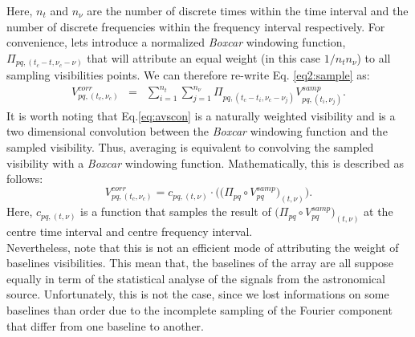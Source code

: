 \documentclass[useAMS,usenatbib]{mn2e}
\begin{document}
Here, $n_t$ and $n_{\nu}$ are the number of discrete times within the time interval  and the number of discrete frequencies 
within the frequency interval  respectively. For convenience, lets introduce a normalized \textit{Boxcar} windowing 
function, $\Pi_{pq,(t_c - t,\nu_c -\nu)}$  that will attribute an equal weight (in this case $1/n_t n_{\nu}$) to all sampling visibilities 
points. We can therefore re-write Eq. \ref{eq2:sample} as:
\begin{eqnarray}
V_{pq,(t_c,\nu_c)}^{corr}&=&\sum_{i=1}^{n_t}\sum_{j=1}^{n_{\nu}}\Pi_{pq,(t_c - t_i,\nu_c -\nu_j)}V_{pq,(t_i,\nu_j)}^{samp}. 
\label{eq:avscon}
\end{eqnarray}
It is worth noting that Eq.\ref{eq:avscon} is a naturally weighted visibility and is a two dimensional convolution between the 
\textit{Boxcar} windowing function and the sampled visibility. Thus, averaging is equivalent to convolving the 
sampled 
visibility with a \textit{Boxcar} windowing function. Mathematically, this is described as follows:
\begin{equation}
 V_{pq,(t_c,\nu_c)}^{corr}=c_{pq,(t,\nu)}\cdot\Bigg(\Big(\Pi_{pq}\circ V_{pq}^{samp}\Big)_{(t,\nu)}\Bigg). \label{f4}
\end{equation}
Here, $c_{pq,(t,\nu)}$ is a function that samples the result of $\Big(\Pi_{pq}\circ V_{pq}^{samp}\Big)_{(t,\nu)}$ at 
the centre time interval and centre frequency interval. 
\\%
Nevertheless, note that this is not an efficient mode of attributing the weight of baselines visibilities. This mean that, the baselines 
of the array are all suppose equally in term of the statistical analyse of the signals from the astronomical source. Unfortunately, this 
is not the case, since we lost informations on some baselines than order due to the incomplete sampling of the Fourier component that 
differ from one baseline to another.
\end{document}

